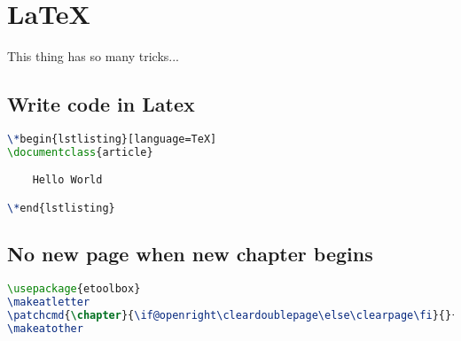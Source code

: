 \section{LaTeX}
This thing has so many tricks...
\subsection{Write code in Latex}
\begin{lstlisting}[language=TeX]
\*begin{lstlisting}[language=TeX]
\documentclass{article}

    Hello World

\*end{lstlisting}
\end{lstlisting}

\subsection{No new page when new chapter begins}
\begin{lstlisting}[language=TeX]
\usepackage{etoolbox}
\makeatletter
\patchcmd{\chapter}{\if@openright\cleardoublepage\else\clearpage\fi}{}{}{}
\makeatother
\end{lstlisting}
